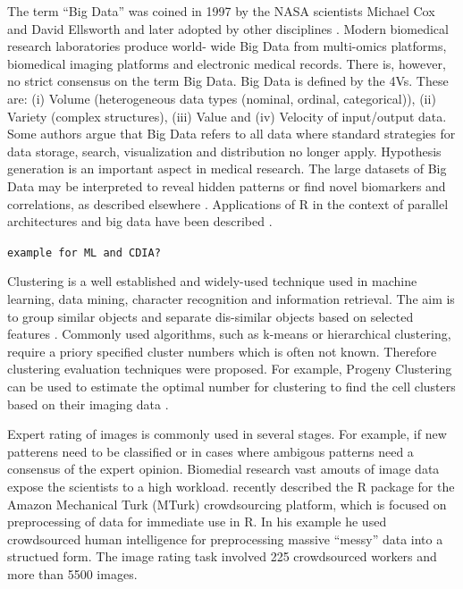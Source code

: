 The term ``Big Data'' was coined in 1997 by the NASA scientists Michael Cox and 
David Ellsworth and later adopted by other disciplines 
\citep{cox_application-controlled_1997}. Modern biomedical research laboratories 
produce world- wide Big Data from multi-omics platforms, biomedical imaging 
platforms and electronic medical records. There is, however, no strict consensus 
on the term Big Data. Big Data is defined by the 4Vs. These are: (i) Volume 
(heterogeneous data types (nominal, ordinal, categorical)), (ii) Variety 
(complex structures), (iii) Value and (iv) Velocity of input/output data. Some 
authors argue that Big Data refers to all data where standard strategies for 
data storage, search, visualization and distribution no longer apply. Hypothesis 
generation is an important aspect in medical research. The large datasets of Big 
Data may be interpreted to reveal hidden patterns or find novel biomarkers and 
correlations, as described elsewhere \citep{willis_immune_2015}. Applications of R in the context of parallel architectures
and big data have been described \citep{das_ricardo:_2010, pbdR2012, gandrud_reproducible_2013, qian_pivotalr:_2014}.

\texttt{example for ML and CDIA?}

Clustering is a well established and widely-used technique used in machine 
learning, data mining, character recognition and information retrieval. The aim 
is to group similar objects and separate dis-similar objects based on selected 
features \citep{szkaliczki_clustering._2016, hu_progenyclust:_2016}.  Commonly 
used algorithms, such as k-means or hierarchical clustering, require a priory 
specified cluster numbers which is often not known. Therefore clustering 
evaluation techniques were proposed. For example, Progeny Clustering can be used 
to estimate the optimal number for clustering to find the cell clusters based on 
their imaging data \citep{hu_progenyclust:_2016}.

Expert rating of images is commonly used in several stages. For example, if new 
patterens need to be classified or in cases where ambigous patterns need a 
consensus of the expert opinion. Biomedial research vast amouts of image data 
expose the scientists to a high workload. \citet{leeper_crowdsourced_2016} 
recently described the R package  for the Amazon Mechanical Turk 
(MTurk) crowdsourcing platform, which is focused on preprocessing of data for 
immediate use in R. In his example he used crowdsourced human intelligence for 
preprocessing massive ``messy'' data into a structued form. The image rating 
task involved 225 crowdsourced workers and more than 5500 images.

